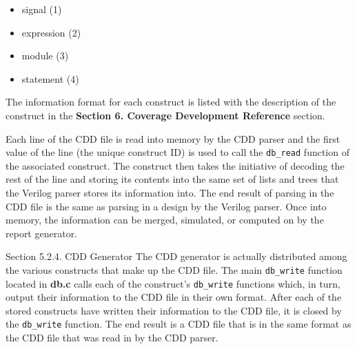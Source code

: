 \begin{Desc}
\item[]\begin{itemize}
\item signal (1)\item expression (2)\item module (3)\item statement (4)\end{itemize}
\end{Desc}
\begin{Desc}
\item[]The information format for each construct is listed with the description of the construct in the {\bf Section 6.  Coverage Development Reference} section.\end{Desc}
\begin{Desc}
\item[]Each line of the CDD file is read into memory by the CDD parser and the first value of the line (the unique construct ID) is used to call the {\tt db\_\-read}  function of the associated construct. The construct then takes the initiative of decoding the rest of the line and storing its contents into the same set of lists and trees that the Verilog parser stores its information into. The end result of parsing in the CDD file is the same as parsing in a design by the Verilog parser. Once into memory, the information can be merged, simulated, or computed on by the report generator.\end{Desc}




\begin{Desc}
\item[Section 5.2.4. CDD Generator]The CDD generator is actually distributed among the various constructs that make up the CDD file. The main {\tt db\_\-write}  function located in {\bf db.c} calls each of the construct's {\tt db\_\-write}  functions which, in turn, output their information to the CDD file in their own format. After each of the stored constructs have written their information to the CDD file, it is closed by the {\tt db\_\-write}  function. The end result is a CDD file that is in the same format as the CDD file that was read in by the CDD parser.\end{Desc}




